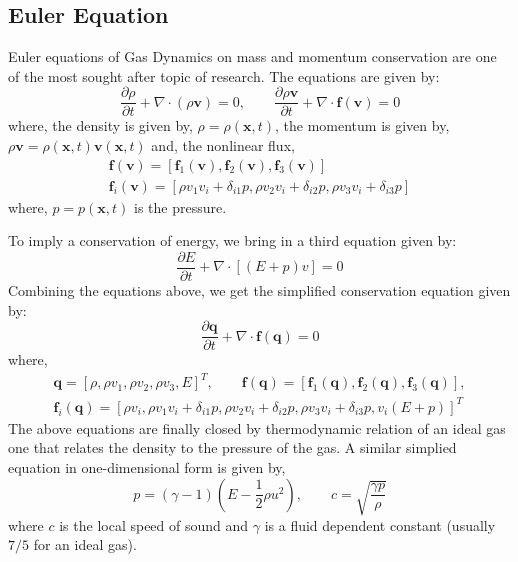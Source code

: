 \documentclass[11pt, a4paper]{report}
\begin{document}
\subsection{Euler Equation}
Euler equations of Gas Dynamics on mass and momentum conservation are one of the most sought after topic of research. 
The equations are given by:
\begin{equation*}
    \frac{\partial \rho}{\partial t} + \nabla\cdot (\rho \bm{v}) = 0, \qquad \frac{ \partial \rho \bm{v}}{\partial t} + \nabla \cdot \bm{f}(\bm{v}) = 0
\end{equation*}
where, the density is given by, $\rho = \rho(\bm{x}, t)$, the momentum is given by, $\rho \bm{v} = \rho(\bm{x}, t)\bm{v}(\bm{x}, t)$
and, the nonlinear flux,
\begin{gather*}
        \bm{f}(\bm{v}) = \left[\bm{f}_{1}(\bm{v}), \bm{f}_{2}(\bm{v}), \bm{f}_{3}(\bm{v})\right]\\
        \bm{f}_{i}(\bm{v}) = \left[\rho v_{1}v_{i} + \delta_{i1}p, \rho v_{2}v_{i} + \delta_{i2}p, \rho v_{3}v_{i} + \delta_{i3}p\right]
\end{gather*}
where, $p = p(\bm{x}, t)$ is the pressure.

To imply a conservation of energy, we bring in a third equation given by:
\begin{equation*}
    \frac{\partial E}{\partial t} + \nabla \cdot [(E + p)v] = 0
\end{equation*}
Combining the equations above, we get the simplified conservation equation given by:
\begin{equation*}
    \frac{\partial \bm{q}}{\partial t} + \nabla \cdot \bm{f}(\bm{q}) = 0
\end{equation*}
where,
\begin{gather*}
    \bm{q} = \left[\rho, \rho v_{1}, \rho v_{2}, \rho v_{3}, E\right]^{T}, \qquad \bm{f}(\bm{q}) = \left[\bm{f}_{1}(\bm{q}), \bm{f}_{2}(\bm{q}), \bm{f}_{3}(\bm{q})\right],\\
    \bm{f}_i(\bm{q}) = \left[\rho v_{i}, \rho v_{1}v_{i} + \delta_{i1}p, \rho v_{2}v_{i} + \delta_{i2}p, \rho v_{3}v_{i} + \delta_{i3}p, v_{i}(E + p)\right]^{T}
\end{gather*}
The above equations are finally closed by thermodynamic relation of an ideal gas \textemdash one that relates the
density to the pressure of the gas. A similar simplied equation in one-dimensional form is given by,
\begin{equation*}
    p = (\gamma - 1)\left(E -\frac{1}{2} \rho u^{2}\right), \qquad c = \sqrt{\frac{\gamma p}{\rho}}
\end{equation*}
where $c$ is the local speed of sound and $\gamma$ is a fluid dependent constant (usually $7/5$ for an ideal gas).
\end{document}
